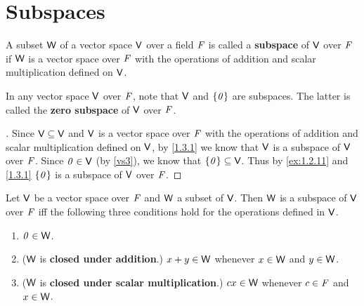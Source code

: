 \section{Subspaces}\label{sec:1.3}

\begin{defn}\label{1.3.1}
  A subset \(\mathsf{W}\) of a vector space \(\mathsf{V}\) over a field \(\mathit{F}\) is called a \textbf{subspace} of \(\mathsf{V}\) over \(\mathit{F}\) if \(\mathsf{W}\) is a vector space over \(\mathit{F}\) with the operations of addition and scalar multiplication defined on \(\mathsf{V}\).
\end{defn}

\begin{eg}\label{1.3.2}
  In any vector space \(\mathsf{V}\) over \(\mathit{F}\), note that \(\mathsf{V}\) and \(\left\lbrace\mathit{0}\right\rbrace\) are subspaces.
  The latter is called the \textbf{zero subspace} of \(\mathsf{V}\) over \(\mathit{F}\).
\end{eg}

\begin{proof}[]
  Since \(\mathsf{V} \subseteq \mathsf{V}\) and \(\mathsf{V}\) is a vector space over \(\mathit{F}\) with the operations of addition and scalar multiplication defined on \(\mathsf{V}\), by \cref{1.3.1} we know that \(\mathsf{V}\) is a subspace of \(\mathsf{V}\) over \(\mathit{F}\).
  Since \(\mathit{0} \in \mathsf{V}\) (by \ref{vs3}), we know that \(\left\lbrace\mathit{0}\right\rbrace \subseteq \mathsf{V}\).
  Thus by \cref{ex:1.2.11} and \cref{1.3.1} \(\left\lbrace\mathit{0}\right\rbrace\) is a subspace of \(\mathsf{V}\) over \(\mathit{F}\).
\end{proof}

\begin{thm}\label{1.3}
  Let \(\mathsf{V}\) be a vector space over \(\mathit{F}\) and \(\mathsf{W}\) a subset of \(\mathsf{V}\).
  Then \(\mathsf{W}\) is a subspace of \(\mathsf{V}\) over \(\mathit{F}\) iff the following three conditions hold for the operations defined in \(\mathsf{V}\).
  \begin{enumerate}
    \item \(\mathit{0} \in \mathsf{W}\).
    \item (\(\mathsf{W}\) is \textbf{closed under addition}.)
          \(x + y \in \mathsf{W}\) whenever \(x \in \mathsf{W}\) and \(y \in \mathsf{W}\).
    \item (\(\mathsf{W}\) is \textbf{closed under scalar multiplication}.)
          \(cx \in \mathsf{W}\) whenever \(c \in \mathit{F}\) and \(x \in \mathsf{W}\).
  \end{enumerate}
\end{thm}

